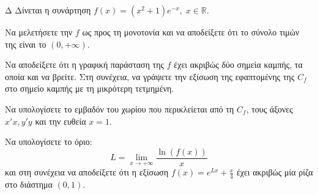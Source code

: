 \begin{thema}{Δ}
Δίνεται η συνάρτηση $\displaystyle f(x) = (x^2+1)e^{-x}, \; x \in \mathbb{R}$.
\begin{erwthma}
    \item Να μελετήσετε την $f$ ως προς τη μονοτονία και να αποδείξετε ότι το σύνολο τιμών της είναι το $(0, +\infty)$.
    \item Να αποδείξετε ότι η γραφική παράσταση της $f$ έχει ακριβώς δύο σημεία καμπής, τα οποία και να βρείτε. Στη συνέχεια, να γράψετε την εξίσωση της εφαπτομένης της $C_f$ στο σημείο καμπής με τη μικρότερη τετμημένη.
    \item Να υπολογίσετε το εμβαδόν του χωρίου που περικλείεται από τη $C_f$, τους άξονες $x'x, y'y$ και την ευθεία $x=1$.
    \item Να υπολογίσετε το όριο:
    \[ L = \lim_{x\to +\infty} \frac{\ln(f(x))}{x} \]
    και στη συνέχεια να αποδείξετε ότι η εξίσωση $\displaystyle f(x) = e^{L x} + \frac{x}{4}$ έχει ακριβώς μία ρίζα στο διάστημα $(0, 1)$.
\end{erwthma}
\end{thema}
